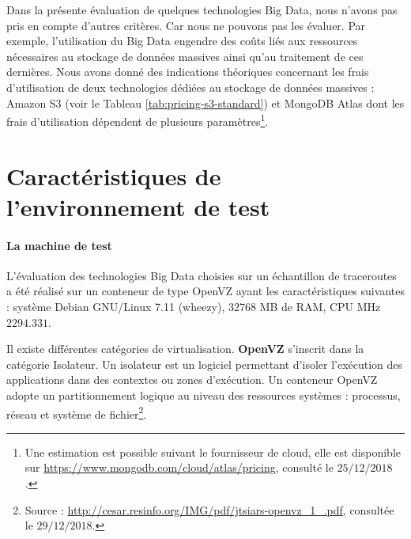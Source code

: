 Dans la présente évaluation de quelques technologies Big Data, nous n'avons pas pris en compte d'autres critères. Car nous ne pouvons pas les évaluer. Par exemple, l'utilisation du  Big Data engendre des coûts  liés aux ressources nécessaires au stockage de données massives ainsi qu'au traitement de ces dernières. Nous avons donné des indications théoriques concernant les frais d'utilisation de deux technologies dédiées au stockage de données massives : Amazon S3 (voir le Tableau \ref{tab:pricing-s3-standard}) et MongoDB Atlas dont les frais d'utilisation  dépendent de plusieurs paramètres\footnote{Une estimation est possible suivant le fournisseur de cloud, elle est disponible  sur \url{https://www.mongodb.com/cloud/atlas/pricing}, consulté le $25/12/2018$.}. 

\section{Caractéristiques de l'environnement de test}

\paragraph{La machine de test} L'évaluation des technologies Big Data choisies sur un échantillon de traceroutes a été réalisé sur un conteneur de type OpenVZ ayant les caractéristiques suivantes :  système Debian GNU/Linux 7.11 (wheezy),  32768 MB de  RAM, CPU MHz $ 2294.331 $.

\begin{tcolorbox}
	Il existe différentes catégories de virtualisation. \textbf{OpenVZ} s'inscrit dans la catégorie Isolateur. Un isolateur est un logiciel permettant d'isoler l'exécution des applications dans des contextes ou zones d'exécution. Un conteneur OpenVZ  adopte un partitionnement logique au niveau des ressources systèmes : processus, réseau et système de fichier\footnote{Source : \url{http://cesar.resinfo.org/IMG/pdf/jtsiars-openvz_1_.pdf}, consultée le $29/12/2018$.}.
\end{tcolorbox}

